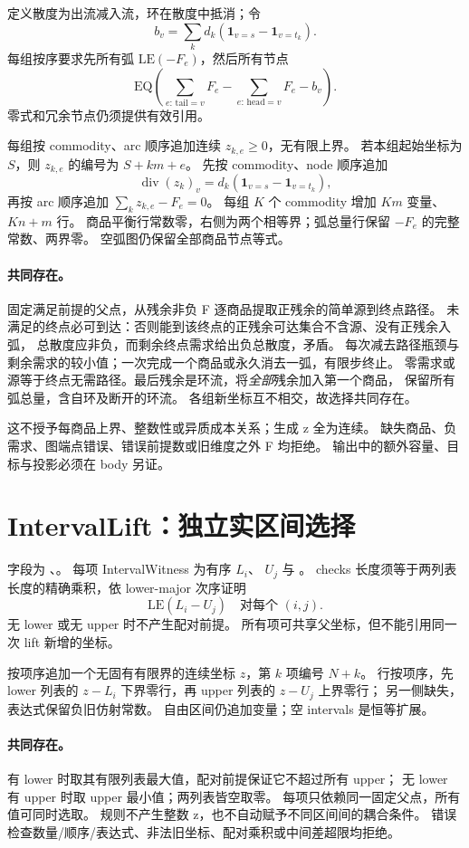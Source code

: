 定义散度为出流减入流，环在散度中抵消；令
\[
 b_v=\sum_k d_k(\mathbf1_{v=s}-\mathbf1_{v=t_k}).
\]
每组按序要求先所有弧 $\mathrm{LE}(-F_e)$，然后所有节点
\[
 \mathrm{EQ}\left(\sum_{e:\,\mathrm{tail}=v}F_e-
 \sum_{e:\,\mathrm{head}=v}F_e-b_v\right).
\]
零式和冗余节点仍须提供有效引用。

每组按 commodity、arc 顺序追加连续 $z_{k,e}\ge0$，无有限上界。
若本组起始坐标为 $S$，则 $z_{k,e}$ 的编号为 $S+km+e$。
先按 commodity、node 顺序追加
\[
 \operatorname{div}(z_k)_v=d_k(\mathbf1_{v=s}-\mathbf1_{v=t_k}),
\]
再按 arc 顺序追加 $\sum_k z_{k,e}-F_e=0$。
每组 $K$ 个 commodity 增加 $Km$ 变量、$Kn+m$ 行。
商品平衡行常数零，右侧为两个相等界；弧总量行保留 $-F_e$ 的完整常数、两界零。
空弧图仍保留全部商品节点等式。

\paragraph{共同存在。}固定满足前提的父点，从残余非负 F 逐商品提取正残余的简单源到终点路径。
未满足的终点必可到达：否则能到该终点的正残余可达集合不含源、没有正残余入弧，
总散度应非负，而剩余终点需求给出负总散度，矛盾。
每次减去路径瓶颈与剩余需求的较小值；一次完成一个商品或永久消去一弧，有限步终止。
零需求或源等于终点无需路径。最后残余是环流，将\emph{全部}残余加入第一个商品，
保留所有弧总量，含自环及断开的环流。
各组新坐标互不相交，故选择共同存在。

这不授予每商品上界、整数性或异质成本关系；生成 z 全为连续。
缺失商品、负需求、图端点错误、错误前提数或旧维度之外 F 均拒绝。
输出中的额外容量、目标与投影必须在 body 另证。

\section{IntervalLift：独立实区间选择}
\label{ins:interval-lift}

字段为 、。
每项 IntervalWitness 为有序  $L_i$、 $U_j$ 与 。
checks 长度须等于两列表长度的精确乘积，依 lower-major 次序证明
\[
 \mathrm{LE}(L_i-U_j)\quad\text{对每个 }(i,j).
\]
无 lower 或无 upper 时不产生配对前提。
所有项可共享父坐标，但不能引用同一次 lift 新增的坐标。

按项序追加一个无固有有限界的连续坐标 $z$，第 $k$ 项编号 $N+k$。
行按项序，先 lower 列表的 $z-L_i$ 下界零行，再 upper 列表的 $z-U_j$ 上界零行；
另一侧缺失，表达式保留负旧仿射常数。
自由区间仍追加变量；空 intervals 是恒等扩展。

\paragraph{共同存在。}有 lower 时取其有限列表最大值，配对前提保证它不超过所有 upper；
无 lower 有 upper 时取 upper 最小值；两列表皆空取零。
每项只依赖同一固定父点，所有值可同时选取。
规则不产生整数 z，也不自动赋予不同区间间的耦合条件。
错误检查数量/顺序/表达式、非法旧坐标、配对乘积或中间差超限均拒绝。

